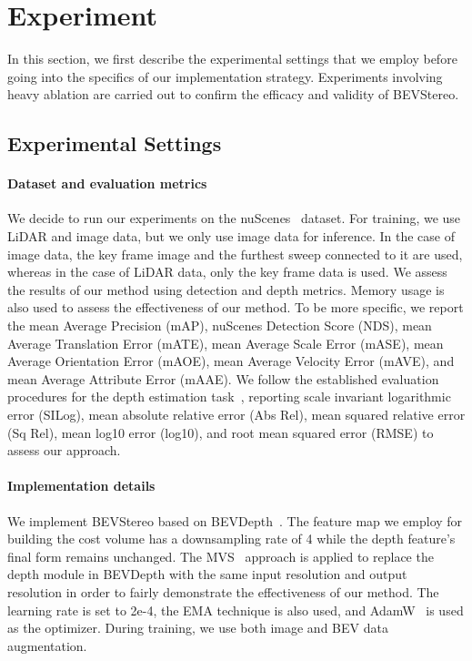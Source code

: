 \documentclass[letterpaper]{article} \usepackage[]{aaai23}  \usepackage{times}  \usepackage{helvet}  \usepackage{courier}  \usepackage[hyphens]{url}  \usepackage{graphicx} \urlstyle{rm} \def\UrlFont{\rm}  \usepackage{natbib}  \usepackage{caption} \frenchspacing  \setlength{\pdfpagewidth}{8.5in} \setlength{\pdfpageheight}{11in} \usepackage{algorithm}
\begin{document}
\section{Experiment}
In this section, we first describe the experimental settings that we employ before going into the specifics of our implementation strategy. Experiments involving heavy ablation are carried out to confirm the efficacy and validity of BEVStereo.




\subsection{Experimental Settings}
\paragraph{Dataset and evaluation metrics}
We decide to run our experiments on the nuScenes~\cite{caesar2020nuscenes} dataset. For training, we use LiDAR and image data, but we only use image data for inference. In the case of image data, the key frame image and the furthest sweep connected to it are used, whereas in the case of LiDAR data, only the key frame data is used. We assess the results of our method using detection and depth metrics. Memory usage is also used to assess the effectiveness of our method. To be more specific, we report the mean Average Precision (mAP), nuScenes Detection Score (NDS), mean Average Translation Error (mATE), mean Average Scale Error (mASE), mean Average Orientation Error (mAOE), mean Average Velocity Error (mAVE), and mean Average Attribute Error (mAAE). We follow the established evaluation procedures for the depth estimation task~\cite{deptheval}, reporting scale invariant logarithmic error (SILog), mean absolute relative error (Abs Rel), mean squared relative error (Sq Rel), mean log10 error (log10), and root mean squared error (RMSE) to assess our approach.

\paragraph{Implementation details}
We implement BEVStereo based on BEVDepth~\cite{li2022bevdepth}. The feature map we employ for building the cost volume has a downsampling rate of 4 while the depth feature's final form remains unchanged. The MVS~\cite{yao2018mvsnet} approach is applied to replace the depth module in BEVDepth with the same input resolution and output resolution in order to fairly demonstrate the effectiveness of our method. The learning rate is set to 2e-4, the EMA technique is also used, and AdamW~\cite{adamw} is used as the optimizer. During training, we use both image and BEV data augmentation.
\end{document}
